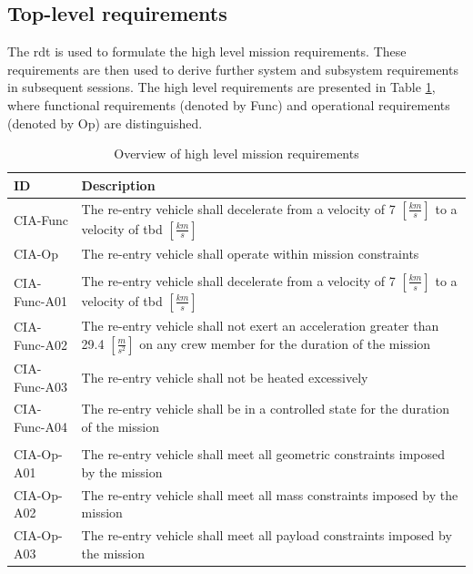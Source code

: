 \subsection{Top-level requirements}
The \gls{rdt} is used to formulate the high level mission requirements. These requirements are then used to derive further system and subsystem requirements in subsequent sessions. The high level requirements are presented in Table \ref{tab:toplevelreq}, where functional requirements (denoted by Func) and operational requirements (denoted by Op) are distinguished.

\begin{table}[H]
	\caption{Overview of high level mission requirements}  \label{tab:toplevelreq}
	\begin{tabular}{|p{}|p{}|}
    \hline
    ID          & Description                                                                                                      \\ \hline \hline
    CIA-Func & The re-entry vehicle shall decelerate from a velocity of 7 $[\frac{km}{s}]$ to a velocity of \gls{tbd} $[\frac{km}{s}]$  \\ \hline
    CIA-Op & The re-entry vehicle shall operate within mission constraints                                               \\ \hline
& \\ \hline
    CIA-Func-A01 & The re-entry vehicle shall decelerate from a velocity of 7 $[\frac{km}{s}]$ to a velocity of \gls{tbd} $[\frac{km}{s}]$     \\ \hline
    CIA-Func-A02 & The re-entry vehicle shall not exert an acceleration greater than 29.4 $[\frac{m}{s^2}]$ on any crew member for the duration of the mission			\\ \hline
    CIA-Func-A03 & The re-entry vehicle shall not be heated excessively  \\ \hline
    CIA-Func-A04 & The re-entry vehicle shall be in a controlled state for the duration of the mission                            \\ \hline
& \\ \hline
    CIA-Op-A01 & The re-entry vehicle shall meet all geometric constraints imposed by the mission                           \\ \hline
    CIA-Op-A02 & The re-entry vehicle shall meet all mass constraints imposed by the mission                                      \\ \hline
	CIA-Op-A03 & The re-entry vehicle shall meet all payload constraints imposed by the mission \\ \hline

\end{tabular}
\end{table}
